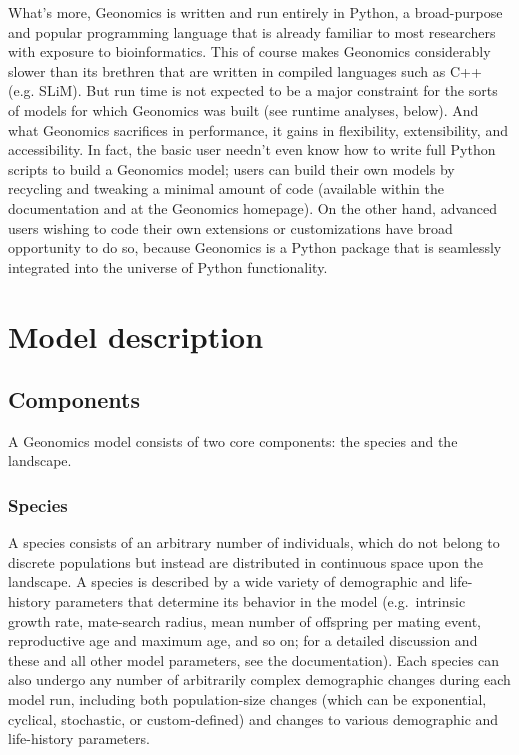 ﻿\documentclass{article}
\begin{document}
What's more, Geonomics is written and run entirely in Python, a broad-purpose and popular
programming language that is already familiar to most researchers with exposure to bioinformatics.
This of course makes Geonomics considerably slower than its brethren that are
written in compiled languages such as C++ (e.g. SLiM). 
But run time is not expected to be a major constraint for the sorts of models
for which Geonomics was built (see runtime analyses, below). 
And what Geonomics sacrifices in performance, it gains in flexibility, extensibility, and accessibility.
In fact, the basic user needn't even know how to write full Python scripts to 
build a Geonomics model; users can build their own models by recycling and tweaking
a minimal amount of code (available within the documentation and at the Geonomics homepage).
On the other hand, advanced users wishing to code their own extensions or customizations
have broad opportunity to do so, because Geonomics is a Python package that is seamlessly
integrated into the universe of Python functionality.


\section{Model description}

\subsection{Components}
A Geonomics model consists of two core components: the species and the landscape.

\subsubsection{Species}
A species consists of an arbitrary number of individuals, which do not belong to
discrete populations but instead are distributed in continuous space upon the landscape.
A species is described by a wide variety of demographic and life-history parameters
that determine its behavior in the model (e.g.\ intrinsic growth rate, mate-search radius,
mean number of offspring per mating event, reproductive age and maximum age, and so on;
for a detailed discussion and these and all other model parameters, see the documentation).
Each species can also undergo any number of arbitrarily complex demographic changes during
each model run, including both population-size changes
(which can be exponential, cyclical, stochastic, or custom-defined)
and changes to various demographic and life-history parameters.
\end{document}
